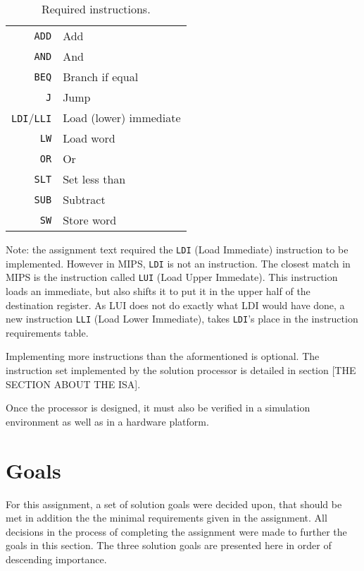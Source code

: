 \begin{table}
    \begin{center}
        \begin{tabular}{r|l}
            \texttt{ADD} & Add \\
            \texttt{AND} & And \\
            \texttt{BEQ} & Branch if equal \\
            \texttt{J} & Jump \\
            \texttt{LDI}/\texttt{LLI} & Load (lower) immediate \\
            \texttt{LW} & Load word \\
            \texttt{OR} & Or \\
            \texttt{SLT} & Set less than \\
            \texttt{SUB} & Subtract \\
            \texttt{SW} & Store word \\
            \hline
        \end{tabular}
        \smallskip
        \smallskip
        \caption{Required instructions.}
        \label{table:required-instructions}
    \end{center}
\end{table}

Note: the assignment text required the \texttt{LDI} (Load Immediate) instruction to be implemented.
However in MIPS, \texttt{LDI} is not an instruction.
The closest match in MIPS is the instruction called \texttt{LUI} (Load Upper Immedate).
This instruction loads an immediate, but also shifts it to put it in the upper half of the destination register.
As LUI does not do exactly what LDI would have done, a new instruction \texttt{LLI} (Load Lower Immediate), takes \texttt{LDI}'s place in the instruction requirements table.

Implementing more instructions than the aformentioned is optional.
The instruction set implemented by the solution processor is detailed in section [THE SECTION ABOUT THE ISA].

Once the processor is designed, it must also be verified in a simulation environment as well as in a hardware platform.

\section{Goals}

For this assignment, a set of solution goals were decided upon, that should be met in addition the the minimal requirements given in the assignment.
All decisions in the process of completing the assignment were made to further the goals in this section.
The three solution goals are presented here in order of descending importance.

